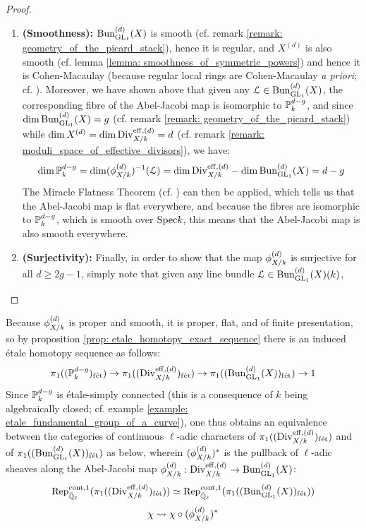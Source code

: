 \begin{proof}
\begin{enumerate}
                            \item \textbf{(Smoothness):} $\Bun_{\GL_1}^{(d)}(X)$ is smooth (cf. remark \ref{remark: geometry_of_the_picard_stack}), hence it is regular, and $X^{(d)}$ is also smooth (cf. lemma \ref{lemma: smoothness_of_symmetric_powers}) and hence it is Cohen-Macaulay (because regular local rings are Cohen-Macaulay \textit{a priori}; cf. \cite[\href{https://stacks.math.columbia.edu/tag/00NQ}{Tag 00NQ}]{stacks}). Moreover, we have shown above that given any $\calL \in \Bun_{\GL_1}^{(d)}(X)$, the corresponding fibre of the Abel-Jacobi map is isomorphic to $\P^{d - g}_k$, and since $\dim \Bun_{\GL_1}^{(d)}(X) = g$ (cf. remark \ref{remark: geometry_of_the_picard_stack}) while $\dim X^{(d)} = \dim \Div_{X/k}^{\eff, (d)} = d$ (cf. remark \ref{remark: moduli_space_of_effective_divisors}), we have:
                                $$\dim \P^{d - g}_k = \dim (\AJ_{X/k}^{(d)})^{-1}(\calL) = \dim \Div_{X/k}^{\eff, (d)} - \dim \Bun_{\GL_1}^{(d)}(X) = d - g$$
                            The Miracle Flatness Theorem (cf. \cite[\href{https://stacks.math.columbia.edu/tag/00R4}{Tag 00R4}]{stacks}) can then be applied, which tells us that the Abel-Jacobi map is flat everywhere, and because the fibres are isomorphic to $\P^{d - g}_k$, which is smooth over $\Spec k$, this means that the Abel-Jacobi map is also smooth everywhere.
                            \item \textbf{(Surjectivity):} Finally, in order to show that the map $\AJ_{X/k}^{(d)}$ is surjective for all $d \geq 2g - 1$, simply note that given any line bundle $\calL \in \Bun_{\GL_1}^{(d)}(X)(k)$, 
                        \end{enumerate}
                \end{proof}
            \begin{corollary} \label{coro: unramified_galois_representations_induced_by_the_abel_jacobi_map}
                Because $\AJ_{X/k}^{(d)}$ is proper and smooth, it is proper, flat, and of finite presentation, so by proposition \ref{prop: etale_homotopy_exact_sequence} there is an induced \'etale homotopy sequence as follows:
                    $$\pi_1((\P^{d - g}_k)_{\fet}) \to \pi_1((\Div_{X/k}^{\eff, (d)})_{\fet}) \to \pi_1((\Bun_{\GL_1}^{(d)}(X))_{\fet}) \to 1$$
                Since $\P^{d - g}_k$ is \'etale-simply connected (this is a consequence of $k$ being algebraically closed; cf. example \ref{example: etale_fundamental_group_of_a_curve}), one thus obtains an equivalence between the categories of continuous $\ell$-adic characters of $\pi_1((\Div_{X/k}^{\eff, (d)})_{\fet})$ and of $\pi_1((\Bun_{\GL_1}^{(d)}(X))_{\fet})$ as below, wherein $(\AJ_{X/k}^{(d)})^*$ is the pullback of $\ell$-adic sheaves along the Abel-Jacobi map $\AJ_{X/k}^{(d)}: \Div_{X/k}^{\eff, (d)} \to \Bun_{\GL_1}^{(d)}(X)$:
                    $$\Rep^{\cont, 1}_{\bar{\Q}_{\ell}}(\pi_1((\Div_{X/k}^{\eff, (d)})_{\fet})) \cong \Rep^{\cont, 1}_{\bar{\Q}_{\ell}}(\pi_1((\Bun_{\GL_1}^{(d)}(X))_{\fet}))$$
                    $$\chi \mapsto \chi \circ (\AJ_{X/k}^{(d)})^*$$
            \end{corollary}
    
